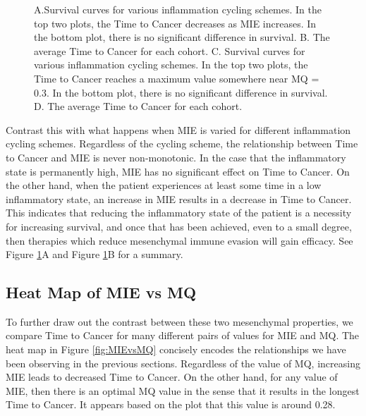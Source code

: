 \documentclass{article}
\begin{document}
\begin{figure}[H]
\center
{}
\caption{A.Survival curves for various inflammation cycling schemes. In the top two plots, the Time to Cancer decreases as MIE increases. In the bottom plot, there is no significant difference in survival.
B. The average Time to Cancer for each cohort.
C. Survival curves for various inflammation cycling schemes. In the top two plots, the Time to Cancer reaches a maximum value somewhere near MQ = 0.3. In the bottom plot, there is no significant difference in survival.
D. The average Time to Cancer for each cohort.}
\label{fig:VaryINFL_and_MesPars}
\end{figure}

Contrast this with what happens when MIE is varied for different inflammation cycling schemes.
Regardless of the cycling scheme, the relationship between Time to Cancer and MIE is never non-monotonic.
In the case that the inflammatory state is permanently high, MIE has no significant effect on Time to Cancer.
On the other hand, when the patient experiences at least some time in a low inflammatory state, an increase in MIE results in a decrease in Time to Cancer.
This indicates that reducing the inflammatory state of the patient is a necessity for increasing survival, and once that has been achieved, even to a small degree, then therapies which reduce mesenchymal immune evasion will gain efficacy.
See Figure \ref{fig:VaryINFL_and_MesPars}A and Figure \ref{fig:VaryINFL_and_MesPars}B for a summary.

\subsection{Heat Map of MIE vs MQ}
To further draw out the contrast between these two mesenchymal properties, we compare Time to Cancer for many different pairs of values for MIE and MQ.
The heat map in Figure \ref{fig:MIEvsMQ} concisely encodes the relationships we have been observing in the previous sections.
Regardless of the value of MQ, increasing MIE leads to decreased Time to Cancer.
On the other hand, for any value of MIE, then there is an optimal MQ value in the sense that it results in the longest Time to Cancer.
It appears based on the plot that this value is around 0.28.
\end{document}
